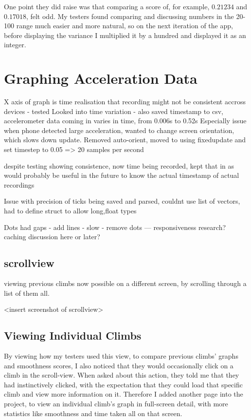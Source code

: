 One point they did raise was that comparing a score of, for example, $0.21234$ and $0.17018$, felt odd.
My testers found comparing and discussing numbers in the 20-100 range much easier and more natural, so on the next iteration of the app, before displaying the variance I multiplied it by a hundred and displayed it as an integer.


\section{Graphing Acceleration Data}
X axis of graph is time
realisation that recording might not be consistent accross devices - tested 
Looked into time variation - also saved timestamp to csv, accelerometer data coming in varies in time, from 0.006s to 0.52s 
Especially issue when phone detected large acceleration, wanted to change screen orientation, which slows down update.
Removed auto-orient,  moved to using fixedupdate and set timestep to 0.05 => 20 samples per second

despite testing showing consistence, now time being recorded, kept that in as would probably be useful in the future to know the actual timestamp of actual recordings



Issue with precision of ticks being saved and parsed, couldnt use list of vectors, had to define struct to allow long,float types


Dots had gaps - add lines - slow - remove dots ---  responsiveness research?
caching discussion here or later?


\subsection{scrollview}
viewing previous climbs now possible on a different screen, by scrolling through a list of them all.

<insert screenshot of scrollview>

\subsection{Viewing Individual Climbs}
By viewing how my testers used this view, to compare previous climbs' graphs and smoothness scores, I also noticed that they would occasionally click on a climb in the scroll-view.
When asked about this action, they told me that they had instinctively clicked, with the expectation that they could load that specific climb and view more information on it.
Therefore I added another page into the project, to view an individual climb's graph in full-screen detail, with more statistics like smoothness and time taken all on that screen.

